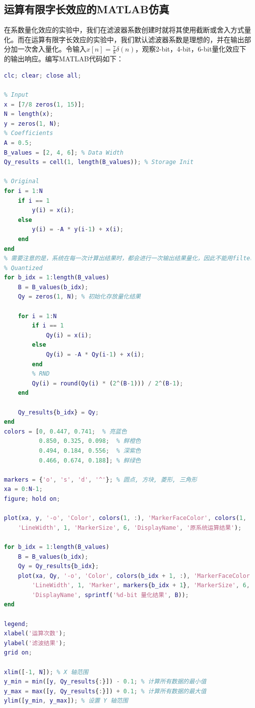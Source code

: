 \subsection{运算有限字长效应的MATLAB仿真}
在系数量化效应的实验中，我们在滤波器系数创建时就将其使用截断或舍入方式量化。而在运算有限字长效应的实验中，我们默认滤波器系数是理想的，并在输出部分加一次舍入量化。令输入$x[n] = \frac{7}{8}\delta(n)$，观察2-bit，4-bit，6-bit量化效应下的输出响应。编写MATLAB代码如下：
\begin{lstlisting}[language=matlab]
clc; clear; close all;

% Input
x = [7/8 zeros(1, 15)];
N = length(x);
y = zeros(1, N);
% Coefficients
A = 0.5;
B_values = [2, 4, 6]; % Data Width
Qy_results = cell(1, length(B_values)); % Storage Init

% Original
for i = 1:N
    if i == 1
        y(i) = x(i);
    else
        y(i) = -A * y(i-1) + x(i);
    end
end
% 需要注意的是，系统在每一次计算出结果时，都会进行一次输出结果量化，因此不能用filter函数进行计算
% Quantized
for b_idx = 1:length(B_values)
    B = B_values(b_idx);
    Qy = zeros(1, N); % 初始化存放量化结果

    for i = 1:N
        if i == 1
            Qy(i) = x(i);
        else
            Qy(i) = -A * Qy(i-1) + x(i);
        end
        % RND
        Qy(i) = round(Qy(i) * (2^(B-1))) / 2^(B-1);
    end
    
    Qy_results{b_idx} = Qy;
end
colors = [0, 0.447, 0.741;  % 亮蓝色
          0.850, 0.325, 0.098;  % 鲜橙色
          0.494, 0.184, 0.556;  % 深紫色
          0.466, 0.674, 0.188]; % 鲜绿色

markers = {'o', 's', 'd', '^'}; % 圆点, 方块, 菱形, 三角形
xa = 0:N-1;
figure; hold on;

plot(xa, y, '-o', 'Color', colors(1, :), 'MarkerFaceColor', colors(1, :), ...
    'LineWidth', 1, 'MarkerSize', 6, 'DisplayName', '原系统运算结果');

for b_idx = 1:length(B_values)
    B = B_values(b_idx);
    Qy = Qy_results{b_idx};
    plot(xa, Qy, '-o', 'Color', colors(b_idx + 1, :), 'MarkerFaceColor', colors(b_idx + 1, :), ...
        'LineWidth', 1, 'Marker', markers{b_idx + 1}, 'MarkerSize', 6, ...
        'DisplayName', sprintf('%d-bit 量化结果', B));
end

legend;
xlabel('运算次数');
ylabel('滤波结果');
grid on;

xlim([-1, N]); % X 轴范围
y_min = min([y, Qy_results{:}]) - 0.1; % 计算所有数据的最小值
y_max = max([y, Qy_results{:}]) + 0.1; % 计算所有数据的最大值
ylim([y_min, y_max]); % 设置 Y 轴范围
\end{lstlisting}

